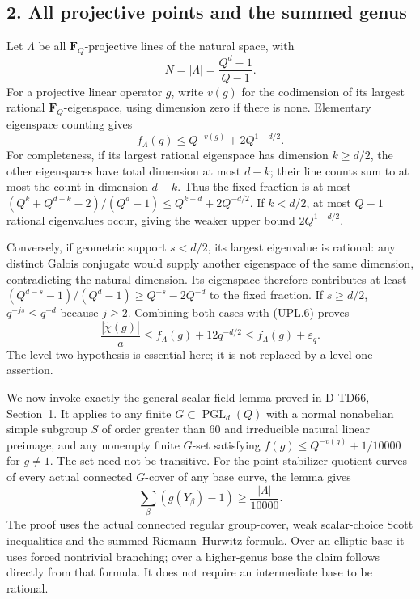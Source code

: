\subsection*{2. All projective points and the summed genus}

Let \(\Lambda\) be all \(\mathbf F_Q\)-projective lines of the
natural space, with
\[
                         N=|\Lambda|=\frac{Q^d-1}{Q-1}.
 \tag{UPL.7}
\]
For a projective linear operator \(g\), write \(v(g)\) for the
codimension of its largest rational \(\mathbf F_Q\)-eigenspace,
using dimension zero if there is none. Elementary eigenspace counting
gives
\[
                 f_\Lambda(g)\le Q^{-v(g)}+2Q^{1-d/2}.
 \tag{UPL.8}
\]
For completeness, if its largest rational eigenspace has dimension
\(k\ge d/2\), the other eigenspaces have total dimension at most
\(d-k\); their line counts sum to at most the count in dimension
\(d-k\). Thus the fixed fraction is at most
\((Q^k+Q^{d-k}-2)/(Q^d-1)\le Q^{k-d}+2Q^{-d/2}\).
If \(k<d/2\), at most \(Q-1\) rational eigenvalues occur, giving
the weaker upper bound \(2Q^{1-d/2}\).

Conversely, if geometric support \(s<d/2\), its largest eigenvalue
is rational: any distinct Galois conjugate would supply another
eigenspace of the same dimension, contradicting the natural dimension.
Its eigenspace therefore contributes at least
\((Q^{d-s}-1)/(Q^d-1)\ge Q^{-s}-2Q^{-d}\) to the fixed fraction.
If \(s\ge d/2\), \(q^{-js}\le q^{-d}\) because \(j\ge2\).
Combining both cases with (UPL.6) proves
\[
           \frac{|\widetilde\chi(g)|}{a}
             \le f_\Lambda(g)+12q^{-d/2}
             \le f_\Lambda(g)+\varepsilon_q.
 \tag{UPL.9}
\]
The level-two hypothesis is essential here; it is not replaced by a
level-one assertion.

We now invoke exactly the general scalar-field lemma proved in
D-TD66, Section~1. It applies to any finite
\(G\subset\operatorname{PGL}_d(Q)\) with a normal nonabelian simple
subgroup \(S\) of order greater than 60 and irreducible natural
linear preimage, and any nonempty finite \(G\)-set satisfying
\(f(g)\le Q^{-v(g)}+1/10000\) for \(g\ne1\).
The set need not be transitive. For the point-stabilizer quotient
curves of every actual connected \(G\)-cover of any base curve,
the lemma gives
\[
                         \sum_\beta(g(Y_\beta)-1)
                                  \ge\frac{|\Lambda|}{10000}.
 \tag{UPL.10}
\]
The proof uses the actual connected regular group-cover, weak
scalar-choice Scott inequalities and the summed Riemann--Hurwitz
formula. Over an elliptic base it uses forced nontrivial branching;
over a higher-genus base the claim follows directly from that formula.
It does not require an intermediate base to be rational.

